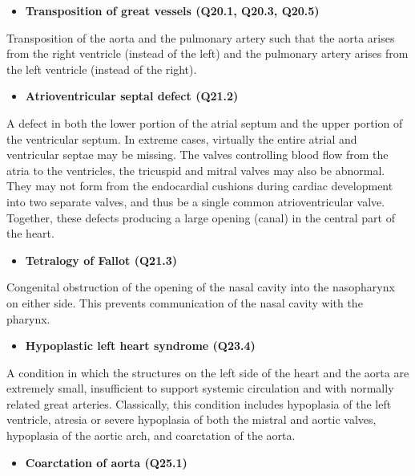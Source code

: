 \documentclass[
]{krantz}
\providecommand{\tightlist}{%
  \setlength{\itemsep}{0pt}\setlength{\parskip}{0pt}}
\begin{document}
\begin{itemize}
\tightlist
\item
  \textbf{Transposition of great vessels (Q20.1, Q20.3, Q20.5)}
\end{itemize}

Transposition of the aorta and the pulmonary artery such that the aorta arises
from the right ventricle (instead of the left) and the pulmonary artery arises from the left ventricle (instead of the right).

\begin{itemize}
\tightlist
\item
  \textbf{Atrioventricular septal defect (Q21.2)}
\end{itemize}

A defect in both the lower portion of the atrial septum and the upper portion of the ventricular septum. In extreme cases, virtually the entire atrial and ventricular septae may be missing. The valves controlling blood flow from the atria to the ventricles, the tricuspid and mitral valves may also be abnormal. They may not form from the endocardial cushions during cardiac development into two separate valves, and thus be a single common atrioventricular valve. Together, these defects producing a large opening (canal) in the central part of the heart.

\begin{itemize}
\tightlist
\item
  \textbf{Tetralogy of Fallot (Q21.3)}
\end{itemize}

Congenital obstruction of the opening of the nasal cavity into the nasopharynx on either side. This prevents communication of the nasal cavity with the pharynx.

\begin{itemize}
\tightlist
\item
  \textbf{Hypoplastic left heart syndrome (Q23.4)}
\end{itemize}

A condition in which the structures on the left side of the heart and the aorta are extremely small, insufficient to support systemic circulation and with normally related great arteries. Classically, this condition includes hypoplasia of the left ventricle, atresia or severe hypoplasia of both the mistral and aortic valves, hypoplasia of the aortic arch, and coarctation of the aorta.

\begin{itemize}
\tightlist
\item
  \textbf{Coarctation of aorta (Q25.1)}
\end{itemize}
\end{document}
